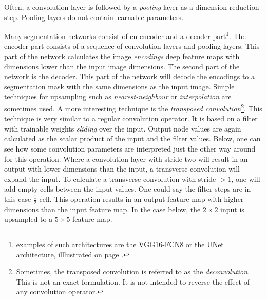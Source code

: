 \par{
    Often, a convolution layer is followed by a \textit{pooling} layer as a dimension reduction step.
    Pooling layers do not contain learnable parameters.
}
\par{
    Many segmentation networks consist of en encoder and a decoder part\footnote{examples of such architectures are the VGG16-FCN8 or the UNet architecture, illlustrated on page \pageref{fig:vgg16}.}.
    The encoder part consists of a sequence of convolution layers and pooling layers. 
    This part of the network calculates the image \textit{encodings} deep feature maps with dimensions lower than the input image dimensions.
    The second part of the network is the decoder. This part of the network will decode the encodings to a segmentation mask with the same dimensions as the input image.
    Simple techniques for upsampling such as \textit{nearest-neighbour} or \textit{interpolation} are sometimes used.
    A more interesting technique is the \textit{transposed convolution}\footnote{Sometimes, the transposed convolution is referred to as the \textit{deconvolution}. This is not an exact formulation. It is not intended to reverse the effect of any convolution operator.}. 
    This technique is very similar to a regular convolution operator. It is based on a filter with trainable weights \textit{sliding} over the input.
    Output node values are again calculated as the scalar product of the input and the filter values.
    Below, one can see how some convolution parameters are interpreted just the other way around for this operation.
    Where a convolution layer with stride two will result in an output with lower dimensions than the input, a transverse convolution will expand the input.
    To calculate a transverse convolution with stride $>1$, one will add empty cells between the input values. 
    One could say the filter steps are in this case $\frac{1}{2}$ cell.
    This operation results in an output feature map with higher dimensions than the input feature map. In the case below, the $2\times 2$ input is upsampled to a $5\times 5$ feature map.
}
